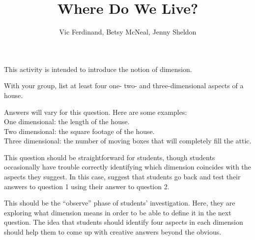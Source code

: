 \documentclass{ximera}
\title{Where Do We Live?}
\author{Vic Ferdinand, Betsy McNeal, Jenny Sheldon}
\begin{document}
\begin{abstract}
\end{abstract}


\maketitle

\begin{instructorIntro}
    This activity is intended to introduce the notion of dimension.  
    
    
\end{instructorIntro}

\begin{problem}
    With your group, list at least four one- two- and three-dimensional aspects of a house.
    
    \begin{solution}
        Answers will vary for this question.  Here are some examples:\\
        One dimensional: the length of the house.\\
        Two dimensional: the square footage of the house.\\
        Three dimensional: the number of moving boxes that will completely fill the attic.
    \end{solution}
    
    \begin{instructorNotes}
        This question should be straightforward for students, though students occasionally have trouble correctly identifying which dimension coincides with the aspects they suggest.  In this case, suggest that students go back and test their answers to question 1 using their answer to question 2.
        
        This should be the ``observe'' phase of students' investigation.  Here, they are exploring what dimension means in order to be able to define it in the next question.  The idea that students should identify four aspects in each dimension should help them to come up with creative answers beyond the obvious.
    \end{instructorNotes}
\end{problem}
\end{document}
